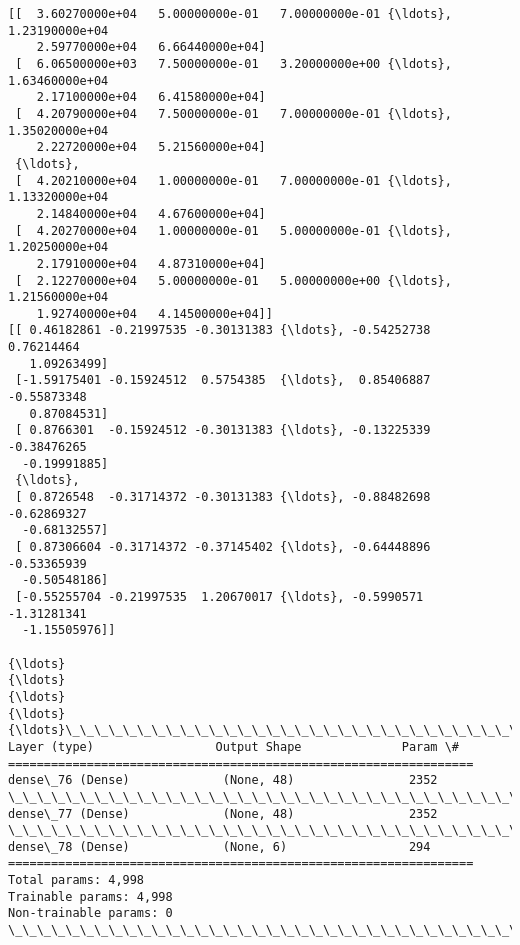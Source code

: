\documentclass[11pt]{article}
\begin{document}
    \begin{Verbatim}[commandchars=\\\{\}]
[[  3.60270000e+04   5.00000000e-01   7.00000000e-01 {\ldots},   1.23190000e+04
    2.59770000e+04   6.66440000e+04]
 [  6.06500000e+03   7.50000000e-01   3.20000000e+00 {\ldots},   1.63460000e+04
    2.17100000e+04   6.41580000e+04]
 [  4.20790000e+04   7.50000000e-01   7.00000000e-01 {\ldots},   1.35020000e+04
    2.22720000e+04   5.21560000e+04]
 {\ldots}, 
 [  4.20210000e+04   1.00000000e-01   7.00000000e-01 {\ldots},   1.13320000e+04
    2.14840000e+04   4.67600000e+04]
 [  4.20270000e+04   1.00000000e-01   5.00000000e-01 {\ldots},   1.20250000e+04
    2.17910000e+04   4.87310000e+04]
 [  2.12270000e+04   5.00000000e-01   5.00000000e+00 {\ldots},   1.21560000e+04
    1.92740000e+04   4.14500000e+04]]
[[ 0.46182861 -0.21997535 -0.30131383 {\ldots}, -0.54252738  0.76214464
   1.09263499]
 [-1.59175401 -0.15924512  0.5754385  {\ldots},  0.85406887 -0.55873348
   0.87084531]
 [ 0.8766301  -0.15924512 -0.30131383 {\ldots}, -0.13225339 -0.38476265
  -0.19991885]
 {\ldots}, 
 [ 0.8726548  -0.31714372 -0.30131383 {\ldots}, -0.88482698 -0.62869327
  -0.68132557]
 [ 0.87306604 -0.31714372 -0.37145402 {\ldots}, -0.64448896 -0.53365939
  -0.50548186]
 [-0.55255704 -0.21997535  1.20670017 {\ldots}, -0.5990571  -1.31281341
  -1.15505976]]

{\ldots}
{\ldots}
{\ldots}
{\ldots}
{\ldots}\_\_\_\_\_\_\_\_\_\_\_\_\_\_\_\_\_\_\_\_\_\_\_\_\_\_\_\_\_\_\_\_\_\_\_\_\_\_\_\_\_\_\_\_\_\_\_\_\_\_\_\_\_\_\_\_\_\_\_\_\_\_\_\_\_
Layer (type)                 Output Shape              Param \#   
=================================================================
dense\_76 (Dense)             (None, 48)                2352      
\_\_\_\_\_\_\_\_\_\_\_\_\_\_\_\_\_\_\_\_\_\_\_\_\_\_\_\_\_\_\_\_\_\_\_\_\_\_\_\_\_\_\_\_\_\_\_\_\_\_\_\_\_\_\_\_\_\_\_\_\_\_\_\_\_
dense\_77 (Dense)             (None, 48)                2352      
\_\_\_\_\_\_\_\_\_\_\_\_\_\_\_\_\_\_\_\_\_\_\_\_\_\_\_\_\_\_\_\_\_\_\_\_\_\_\_\_\_\_\_\_\_\_\_\_\_\_\_\_\_\_\_\_\_\_\_\_\_\_\_\_\_
dense\_78 (Dense)             (None, 6)                 294       
=================================================================
Total params: 4,998
Trainable params: 4,998
Non-trainable params: 0
\_\_\_\_\_\_\_\_\_\_\_\_\_\_\_\_\_\_\_\_\_\_\_\_\_\_\_\_\_\_\_\_\_\_\_\_\_\_\_\_\_\_\_\_\_\_\_\_\_\_\_\_\_\_\_\_\_\_\_\_\_\_\_\_\_

    \end{Verbatim}

    \begin{center}
    \end{center}
    { \hspace*{\fill} \\}
    
\end{document}
